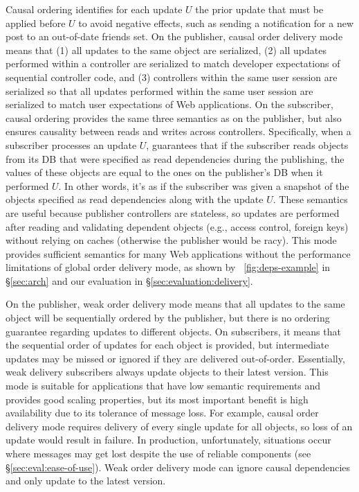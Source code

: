 Causal ordering identifies for each update $U$ the prior update that
must be applied before $U$ to avoid negative effects, such as sending a
notification for a new post to an out-of-date friends set.
On the publisher, causal order delivery mode means that (1) all 
updates to the same object are serialized, (2) all updates performed
within a controller are serialized to match developer expectations of
sequential controller code, and (3) controllers within the same
user session are serialized so that all updates performed within the
same user session are serialized to match user expectations of Web
applications.
On the subscriber, causal ordering provides the same three semantics as on the
publisher, but also ensures causality between
reads and writes across controllers. 
Specifically, when a subscriber processes an update $U$, \synapse guarantees
that if the subscriber reads objects from its DB that were specified as read dependencies
during the publishing, the values of these objects are equal
to the ones on the publisher's DB when it performed $U$.
In other words, it's as if the subscriber was given a snapshot of the objects
specified as read dependencies along with the update $U$.
These semantics are useful because publisher controllers are stateless, so
updates are performed after reading and validating dependent objects (e.g.,
access control, foreign keys) without relying on caches (otherwise the publisher
would be racy).
This mode provides sufficient semantics for many Web applications
without the performance limitations of global order delivery mode, as shown by 
\F~\ref{fig:deps-example} in \S\ref{sec:arch} and our evaluation
in \S\ref{sec:evaluation:delivery}. 


On the publisher, weak order delivery mode means that all updates to the
same object will be sequentially ordered by the publisher, but there
is no ordering guarantee regarding updates to different objects.  On
subscribers, it means that the sequential order of updates for each 
object is provided, but intermediate updates may be
missed or ignored if they are delivered out-of-order.  Essentially,
weak delivery subscribers always update objects to their
latest version.  
This mode is suitable for applications that have low semantic
requirements and provides good scaling properties, but its
most important benefit is high availability due to its tolerance of
message loss.  For example, causal order delivery mode 
requires delivery of every single update for all objects, so loss
of an update would result in failure.  In production, unfortunately,
situations occur where messages may get lost despite the use of
reliable components (see \S\ref{sec:eval:ease-of-use}).  Weak
order delivery mode can ignore causal dependencies and only update
to the latest version.

